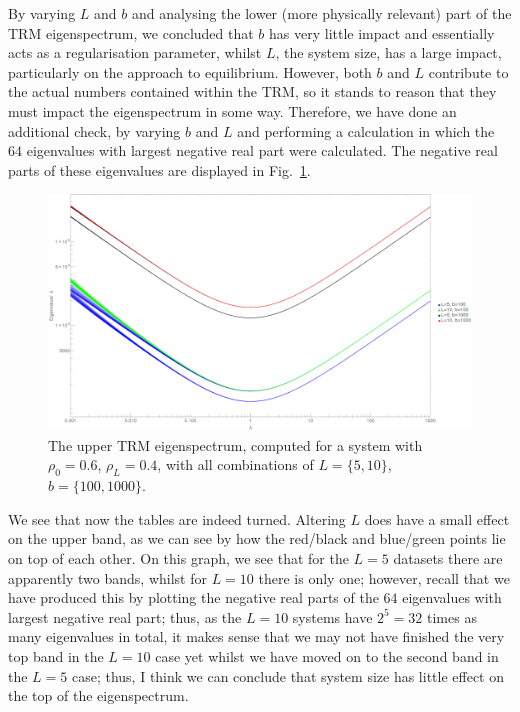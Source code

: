 By varying $L$ and $b$ and analysing the lower (more physically relevant) part of the
TRM eigenspectrum, we concluded that $b$ has very little impact and essentially
acts as a regularisation parameter, whilst $L$, the system size, has a large impact,
particularly on the approach to equilibrium. However, both $b$ and $L$ contribute to
the actual numbers contained within the TRM, so it stands to reason that they must
impact the eigenspectrum in some way. Therefore, we have done an additional check,
by varying $b$ and $L$ and 
performing a calculation in which the $64$ eigenvalues with largest negative real
part were calculated. The negative real parts of these eigenvalues are displayed in
Fig.~\ref{fig:eigsVarBVarLUpper}.
 \begin{figure}[h!]
 \caption[The upper TRM eigenspectrum for a system with $L=\{5, 10\}, $, $b=\{100, 1000\}$.]{\label{fig:eigsVarBVarLUpper} 
 The upper TRM eigenspectrum, computed for a system with $\rho_0 = 0.6$, $\rho_L = 0.4$,
 with all combinations of
 $L=\{5, 10\}$, $b=\{100, 1000\}$.
 }
  \begin{center}
 \includegraphics[width=1.0\textheight, angle=270]{TRM/images/topEigs}
  \end{center}
\end{figure}
We see that now the tables are indeed turned. Altering $L$ does have a small effect on
the upper band, as we can see by how the red/black and blue/green points lie on top
of each other. On this graph, we see that for the $L=5$ datasets there are apparently
two bands, whilst for $L=10$ there is only one; however, recall that we have produced
this by plotting the negative real parts of the $64$ eigenvalues with largest negative
real part; thus, as the $L=10$ systems have $2^5 = 32$ times as many eigenvalues in 
total, it makes sense that we may not have finished the very top band in the $L=10$
case yet whilst we have moved on to the second band in the $L=5$ case; thus, I think
we can conclude that system size has little effect on the top of the eigenspectrum.

